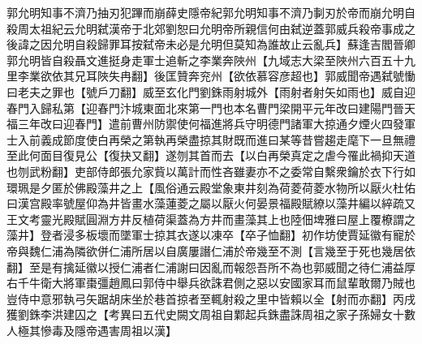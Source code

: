 郭允明知事不濟乃抽刃犯蹕而崩薛史隱帝紀郭允明知事不濟乃剚刃於帝而崩允明自殺周太祖紀云允明弑漢帝于北郊劉恕曰允明帝所親信何由弑逆蓋郭威兵殺帝事成之後諱之因允明自殺歸罪耳按弑帝未必是允明但莫知為誰故止云亂兵】蘇逢吉閻晉卿郭允明皆自殺聶文進挺身走軍士追斬之李業奔陜州【九域志大梁至陜州六百五十九里李業欲依其兄耳陜失冉翻】後匡贊奔兖州【欲依慕容彦超也】郭威聞帝遇弑號慟曰老夫之罪也【號戶刀翻】威至玄化門劉銖雨射城外【雨射者射矢如雨也】威自迎春門入歸私第【迎春門汴城東面北來第一門也本名曹門梁開平元年改曰建陽門晉天福三年改曰迎春門】遣前曹州防禦使何福進將兵守明德門諸軍大掠通夕煙火四發軍士入前義成節度使白再榮之第執再榮盡掠其財既而進曰某等昔嘗趨走麾下一旦無禮至此何面目復見公【復抉又翻】遂刎其首而去【以白再榮真定之虐今罹此禍抑天道也刎武粉翻】吏部侍郎張允家貲以萬計而性吝雖妻亦不之委常自繫衆鑰於衣下行如環珮是夕匿於佛殿藻井之上【風俗通云殿堂象東井刻為荷菱荷菱水物所以厭火杜佑曰漢宫殿率號屋仰為井皆畫水藻蓮菱之屬以厭火何晏景福殿賦繚以藻井編以綷疏又王文考靈光殿賦圓淵方井反植荷渠蓋為方井而畫藻其上也陸佃埤雅曰屋上覆橑謂之藻井】登者浸多板壞而墜軍士掠其衣遂以凍卒【卒子恤翻】初作坊使賈延徽有寵於帝與魏仁浦為隣欲併仁浦所居以自廣屢譖仁浦於帝幾至不測【言幾至于死也幾居依翻】至是有擒延徽以授仁浦者仁浦謝曰因亂而報怨吾所不為也郭威聞之待仁浦益厚右千牛衛大將軍棗彊趙鳳曰郭侍中舉兵欲誅君側之惡以安國家耳而鼠輩敢爾乃賊也豈侍中意邪執弓矢踞胡床坐於巷首掠者至輒射殺之里中皆賴以全【射而亦翻】丙戌獲劉銖李洪建囚之【考異曰五代史闕文周祖自鄴起兵銖盡誅周祖之家子孫婦女十數人極其慘毒及隱帝遇害周祖以漢】

